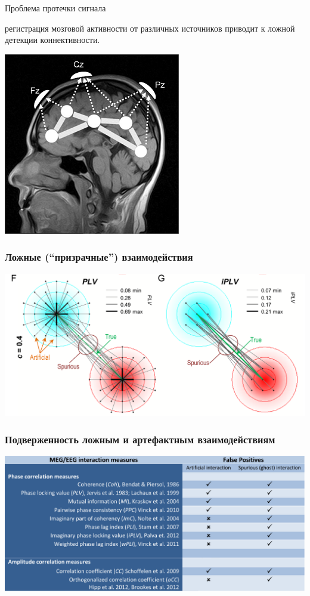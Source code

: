 \documentclass[12pt]{beamer}
\begin{document}
\begin{frame}{Проблема протечки сигнала}

        { регистрация мозговой активности от различных источников приводит
        к ложной детекции коннективности.}

        \centering  
        \includegraphics[scale=0.5]{head.png}
\end{frame}

\begin{frame}[t]
    \frametitle{Ложные (``призрачные'') взаимодействия}
    \vspace{1cm}
    \includegraphics[scale=0.5]{karim_ghost_interactions.png}
    \cite{Palva2018}
\end{frame}

\begin{frame}[t]
    \frametitle{\small Подверженность ложным и артефактным взаимодействиям}
    \vspace{1cm}
    \includegraphics[width=\textwidth]{karim_table.png}
    \cite{Palva2018}
\end{frame}
\end{document}
